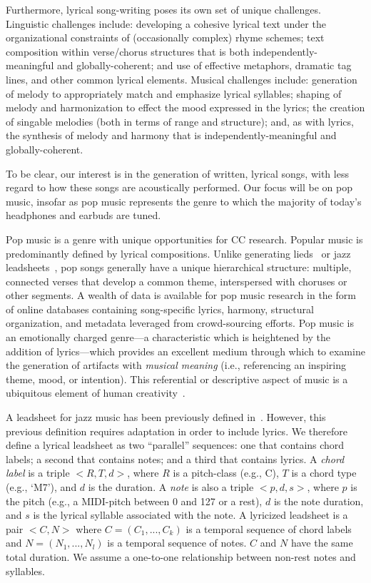 \documentclass[11pt,phd]{byuprop}
\begin{document}
Furthermore, lyrical song-writing poses its own set of unique challenges. Linguistic challenges include: developing a cohesive lyrical text under the organizational constraints of (occasionally complex) rhyme schemes; text composition within verse/chorus structures that is both independently-meaningful and globally-coherent; and use of effective metaphors, dramatic tag lines, and other common lyrical elements. Musical challenges include: generation of melody to appropriately match and emphasize lyrical syllables; shaping of melody and harmonization to effect the mood expressed in the lyrics; the creation of singable melodies (both in terms of range and structure); and, as with lyrics, the synthesis of melody and harmony that is independently-meaningful and globally-coherent.

To be clear, our interest is in the generation of written, lyrical songs, with less regard to how these songs are acoustically performed. Our focus will be on pop music, insofar as pop music represents the genre to which the majority of today's headphones and earbuds are tuned.

Pop music is a genre with unique opportunities for CC research. Popular music is predominantly defined by lyrical compositions. Unlike generating lieds~\cite{toivanen2013automatical} or jazz leadsheets~\cite{pachet2014imitative}, pop songs generally have a unique hierarchical structure: multiple, connected verses that develop a common theme, interspersed with choruses or other segments. A wealth of data is available for pop music research in the form of online databases containing song-specific lyrics, harmony, structural organization, and metadata leveraged from crowd-sourcing efforts. Pop music is an emotionally charged genre---a characteristic which is heightened by the addition of lyrics---which provides an excellent medium through which to examine the generation of artifacts with \emph{musical meaning} (i.e., referencing an inspiring theme, mood, or intention). This referential or descriptive aspect of music is a ubiquitous element of human creativity~\cite{papadopoulos1999ai}.

A leadsheet for jazz music has been previously defined in~\cite{pachet2014imitative}. However, this previous definition requires adaptation in order to include lyrics. We therefore define a lyrical leadsheet as two ``parallel'' sequences: one that contains chord labels; a second that contains notes; and a third that contains lyrics. A \emph{chord label} is a triple $<R, T, d>$, where $R$ is a pitch-class (e.g., C), $T$ is a chord type (e.g., `M7'), and $d$ is the duration. A \emph{note} is also a triple $<p,d,s>$, where $p$ is the pitch (e.g., a MIDI-pitch between 0 and 127 or a rest), $d$ is the note duration, and $s$ is the lyrical syllable associated with the note. A lyricized leadsheet is a pair $<C, N>$ where $C = (C_1,...,C_k)$ is a temporal sequence of chord labels and $N = (N_1,...,N_l)$ is a temporal sequence of notes. $C$ and $N$ have the same total duration. We assume a one-to-one relationship between non-rest notes and syllables.
\end{document}

